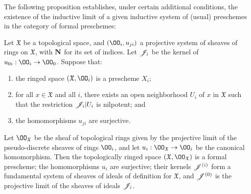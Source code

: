 The following proposition establishes, under certain additional conditions, the existence of the inductive limit of a given inductive system of (usual) preschemes in the category of formal preschemes:
\begin{prop}[10.6.3]
\label{1.10.6.3}
Let $\mathfrak{X}$ be a topological space, and $(\OO_i,u_{ji})$ a projective system of sheaves of rings on $\mathfrak{X}$, with $\mathbf{N}$ for its set of indices.
Let $\mathscr{J}_i$ be the kernel of $u_{0i}:\OO_i\to\OO_0$.
Suppose that:
\begin{enumerate}[label=\emph{(\alph*)}]
  \item the ringed space $(\mathfrak{X},\OO_i)$ is a prescheme $X_i$;
  \item for all $x\in\mathfrak{X}$ and all $i$, there exists an open neighborhood $U_i$ of $x$ in $\mathfrak{X}$ such that the restriction $\mathscr{J}_i|U_i$ is nilpotent; and
  \item the homomorphisms $u_{ji}$ are surjective.
\end{enumerate}

Let $\OO_\mathfrak{X}$ be the sheaf of topological rings given by the projective limit of the pseudo-discrete sheaves of rings $\OO_i$, and let $u_i:\OO_\mathfrak{X}\to\OO_i$ be the canonical homomorphism.
Then the topologically ringed space $(\mathfrak{X},\OO_\mathfrak{X})$ is a formal prescheme; the homomorphisms $u_i$ are surjective; their kernels $\mathscr{J}^{(i)}$ form a fundamental system of sheaves of ideals of definition for $\mathfrak{X}$, and $\mathscr{J}^{(0)}$ is the projective limit of the sheaves of ideals $\mathscr{J}_i$.
\end{prop}

